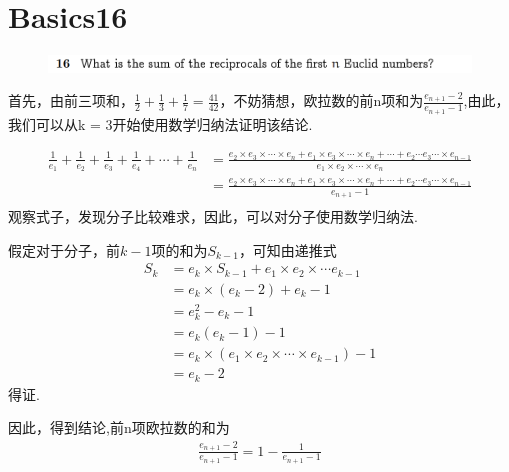 \documentclass[]{article}
\begin{document}
\section*{Basics16}
\begin{figure}[H]
    \includegraphics[scale = 0.6]{2023-03-16-10-47-05.png}
\end{figure}
首先，由前三项和，$\frac{1}{2}+\frac{1}{3}+\frac{1}{7} = \frac{41}{42}$，不妨猜想，欧拉数的前n项和为$\frac{e_{n+1} - 2}{e_{n+1} - 1}$,由此，我们可以从k = 3开始使用数学归纳法证明该结论.
\par 
\begin{align}
    \frac{1}{e_{1}} + \frac{1}{e_{2}} + \frac{1}{e_{3}} + \frac{1}{e_{4}} + \cdots + \frac{1}{e_{n}} &= \frac{e_{2} \times e_{3} \times \cdots \times e_{n} + e_{1} \times e_{3} \times \cdots \times e_{n} + \cdots + e_{2} \cdots e_{3} \cdots \times e_{n-1}}{e_{1} \times e_{2} \times \cdots \times  e_{n}}\\
    &= \frac{e_{2} \times e_{3} \times \cdots \times e_{n} + e_{1} \times e_{3} \times \cdots \times e_{n} + \cdots + e_{2} \cdots e_{3} \cdots \times e_{n-1}}{e_{n+1} - 1}\\
\end{align}
观察式子，发现分子比较难求，因此，可以对分子使用数学归纳法.
\par 
假定对于分子，前$k-1$项的和为$S_{k-1}$，可知由递推式
\begin{align}
    S_{k} &= e_{k} \times S_{k-1} + e_{1}\times e_{2} \times \cdots e_{k-1}\\
    &=e_{k} \times (e_{k} - 2) + e_{k} -1\\
    &=e_{k}^2 - e_{k} -1\\
    &=e_{k}(e_{k} - 1) - 1 \\
    &=e_{k} \times (e_{1} \times e_{2} \times \cdots \times e_{k-1}) -1\\
    &=e_{k} - 2
\end{align}
得证.\par 
因此，得到结论,前n项欧拉数的和为
\begin{align}
    \frac{e_{n+1} - 2}{e_{n+1} - 1} = 1-\frac{1}{e_{n+1} - 1}
\end{align}
\end{document}
